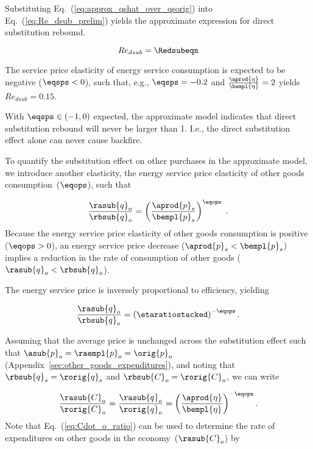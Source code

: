 Substituting Eq.~(\ref{eq:approx_qshat_over_qsorig}) into Eq.~(\ref{eq:Re_dsub_prelim})
yields the approximate expression for direct substitution rebound.

\begin{equation} \label{eq:Re_dsub_approx}
  Re_{dsub} = \Redsubeqn
\end{equation}

The service price elasticity of energy service consumption is
expected to be negative ($\eqsps < 0$), 
such that, e.g.,  
$\eqsps = -0.2$ and $\frac{\aprod{\eta}}{\bempl{\eta}} = 2$
yields $Re_{dsub} = 0.15$.

With $\eqsps \in (-1, 0)$ expected,
the approximate model indicates that
direct substitution rebound will never be larger than 1.
I.e., the direct substitution effect alone
can never cause backfire. 

To quantify the substitution effect on other purchases in the approximate model,
we introduce another elasticity,
the energy service price elasticity of other goods consumption~($\eqops$), 
such that

\begin{equation}
  \frac{\rasub{q}_o}{\rbsub{q}_o} = \left( \frac{\aprod{p}_s}{\bempl{p}_s} \right) ^ {\eqops} \; .
\end{equation}
%
Because the energy service price elasticity of other goods consumption
is positive ($\eqops > 0$),
an energy service price decrease ($\aprod{p}_s < \bempl{p}_s$)
implies a reduction in the rate of consumption of other goods ($\rasub{q}_o < \rbsub{q}_o$).

The energy service price is inversely proportional to 
efficiency, yielding

\begin{equation} \label{eq:qohat_qostar}
  \frac{\rasub{q}_o}{\rbsub{q}_o} = \left( \etaratiostacked \right) ^ {-\eqops} .
\end{equation}

Assuming that the average price is unchanged across the substitution effect
such that $\asub{p}_o = \raempl{p}_o = \orig{p}_o$
(Appendix~\ref{sec:other_goods_expenditures}),
and noting that $\rbsub{q}_s = \rorig{q}_s$ and $\rbsub{C}_o = \rorig{C}_o$,
we can write

\begin{equation} \label{eq:Cdot_o_ratio}
  \frac{\rasub{C}_o}{\rorig{C}_o}
      = \frac{\rasub{q}_o}{\rorig{q}_o}
      = \left( \frac{\aprod{\eta}}{\bempl{\eta}} \right)^{-\eqops} .
\end{equation}
%
Note that Eq.~(\ref{eq:Cdot_o_ratio})
can be used to determine the rate of expenditures
on other goods in the economy~($\rasub{C}_o$) by

